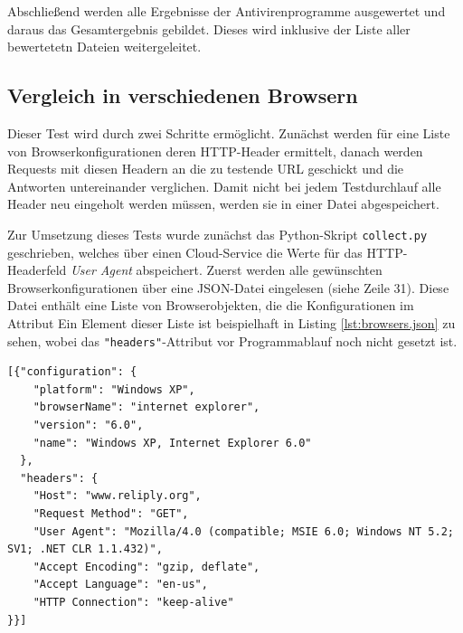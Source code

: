 Abschließend werden alle Ergebnisse der Antivirenprogramme ausgewertet und daraus das Gesamtergebnis gebildet. Dieses wird inklusive der Liste aller bewertetetn Dateien weitergeleitet.

\subsection{Vergleich in verschiedenen Browsern}

Dieser Test wird durch zwei Schritte ermöglicht.
Zunächst werden für eine Liste von Browserkonfigurationen deren \acs{HTTP}-Header ermittelt, danach werden Requests mit diesen Headern an die zu testende \acs{URL} geschickt und die Antworten untereinander verglichen.
Damit nicht bei jedem Testdurchlauf alle Header neu eingeholt werden müssen, werden sie in einer Datei abgespeichert.

Zur Umsetzung dieses Tests wurde zunächst das Python-Skript \lstinline[style=eclipse]{collect.py} geschrieben, welches über einen Cloud-Service die Werte für das \acs{HTTP}-Headerfeld \textit{User Agent} abspeichert.
Zuerst werden alle gewünschten Browserkonfigurationen über eine \ac{JSON}-Datei eingelesen (siehe
Zeile 31).
Diese Datei enthält eine Liste von Browserobjekten, die die Konfigurationen im Attribut 
Ein Element dieser Liste ist beispielhaft in Listing \ref{lst:browsers.json} zu sehen, wobei das
\lstinline[style=eclipse]{"headers"}-Attribut vor Programmablauf noch nicht gesetzt ist.

\newpage

\begin{scriptsize}
\begin{lstlisting}
[{"configuration": {
    "platform": "Windows XP",
    "browserName": "internet explorer",
    "version": "6.0",
    "name": "Windows XP, Internet Explorer 6.0"
  },
  "headers": {
    "Host": "www.reliply.org",
    "Request Method": "GET",
    "User Agent": "Mozilla/4.0 (compatible; MSIE 6.0; Windows NT 5.2; SV1; .NET CLR 1.1.432)",
    "Accept Encoding": "gzip, deflate",
    "Accept Language": "en-us",
    "HTTP Connection": "keep-alive"
}}]
\end{lstlisting}
\end{scriptsize}

